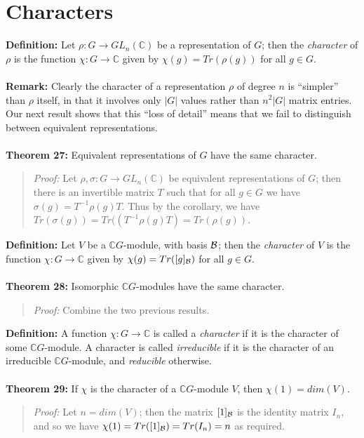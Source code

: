 {\section{Characters}
{\bf Definition:} Let $\rho:G\rightarrow GL_n({\mathbb C})$ be a representation
of $G$; then the \emph{character} of $\rho$ is the function
$\chi:G\rightarrow{\mathbb C}$ given by $\chi(g)=Tr(\rho(g))$ for all $g\in G$.
\\
\\
{\bf Remark:}
Clearly the character of a representation $\rho$ of degree $n$ is ``simpler''
than $\rho$ itself, in that it involves only $|G|$ values rather than
$n^2|G|$ matrix entries. Our next result shows that this ``loss of detail''
means that we fail to distinguish between equivalent representations.
\\
\\
{\bf Theorem 27:} Equivalent representations of $G$ have the
same character.
\begin{quote}
\emph{Proof:}
Let $\rho,\sigma: G \rightarrow GL_n({\mathbb C})$ be equivalent representations of
$G$; then there is an invertible matrix $T$ such that for all $g\in G$ we have
$\sigma(g)=T^{-1}\rho(g)T$. Thus by the corollary, we have
$Tr(\sigma(g))=Tr((T^{-1}\rho(g)T)=Tr(\rho(g))$.
\end{quote}
{\bf Definition:} Let $V$ be a ${\mathbb C}G$-module, with basis ${\cal B}$; then the
\emph{character} of $V$ is the function $\chi:G\rightarrow{\mathbb C}$ given by
$\chi(g)=Tr([g]_{\cal B})$ for all $g\in G$.
\\
\\
{\bf Theorem 28:} Isomorphic ${\mathbb C}G$-modules have the same
character.
\begin{quote}
\emph{Proof:}
Combine the two previous results.
\end{quote}
{\bf Definition:} A function $\chi: G \rightarrow {\mathbb C}$ is called a
\emph{character} if it is the character of some ${\mathbb C}G$-module. A character is
called \emph{irreducible} if it is the character of an
irreducible ${\mathbb C}G$-module, and \emph{reducible} otherwise.
\\
\\
{\bf Theorem 29:} If $\chi$ is the character of a
${\mathbb C}G$-module $V$, then $\chi(1)= dim(V)$.
\begin{quote}
\emph{Proof:}
Let $n= dim (V)$; then the matrix $[1]_{\cal B}$ is the identity matrix $I_n$, and
so we have $\chi(1)=Tr([1]_{\cal B})=Tr( I_n)=n$ as required.
\end{quote}
}
